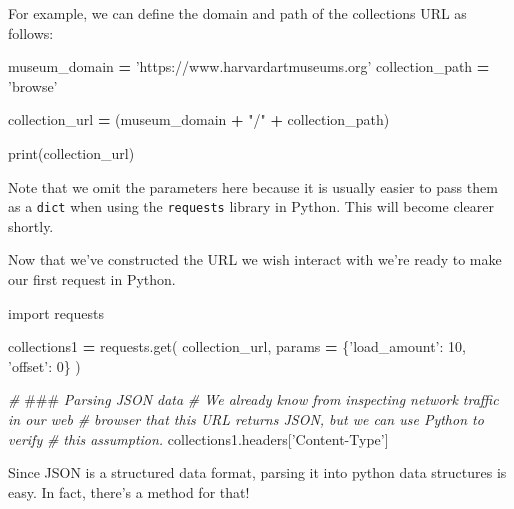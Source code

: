 \documentclass[]{book}
\newenvironment{Shaded}{\begin{snugshade}}{\end{snugshade}}
\newcommand{\DecValTok}[1]{\textcolor[rgb]{0.00,0.00,0.81}{#1}}
\newcommand{\StringTok}[1]{\textcolor[rgb]{0.31,0.60,0.02}{#1}}
\newcommand{\ImportTok}[1]{#1}
\newcommand{\CommentTok}[1]{\textcolor[rgb]{0.56,0.35,0.01}{\textit{#1}}}
\newcommand{\OperatorTok}[1]{\textcolor[rgb]{0.81,0.36,0.00}{\textbf{#1}}}
\newcommand{\BuiltInTok}[1]{#1}
\newcommand{\AlertTok}[1]{\textcolor[rgb]{0.94,0.16,0.16}{#1}}
\newcommand{\NormalTok}[1]{#1}
\begin{document}
For example, we can define the domain and path of the collections URL as
follows:

\begin{Shaded}
\begin{Highlighting}[]
\NormalTok{museum_domain }\OperatorTok{=} \StringTok{'https://www.harvardartmuseums.org'}
\NormalTok{collection_path }\OperatorTok{=} \StringTok{'browse'}

\NormalTok{collection_url }\OperatorTok{=}\NormalTok{ (museum_domain}
                  \OperatorTok{+} \StringTok{"/"}
                  \OperatorTok{+}\NormalTok{ collection_path)}

\BuiltInTok{print}\NormalTok{(collection_url)}
\end{Highlighting}
\end{Shaded}

Note that we omit the parameters here because it is usually easier to
pass them as a \texttt{dict} when using the \texttt{requests} library in
Python. This will become clearer shortly.

Now that we've constructed the URL we wish interact with we're ready to
make our first request in Python.

\begin{Shaded}
\begin{Highlighting}[]
\ImportTok{import}\NormalTok{ requests}

\NormalTok{collections1 }\OperatorTok{=}\NormalTok{ requests.get(}
\NormalTok{    collection_url,}
\NormalTok{    params }\OperatorTok{=}\NormalTok{ \{}\StringTok{'load_amount'}\NormalTok{: }\DecValTok{10}\NormalTok{,}
                  \StringTok{'offset'}\NormalTok{: }\DecValTok{0}\NormalTok{\}}
\NormalTok{)}
\end{Highlighting}
\end{Shaded}

\begin{Shaded}
\begin{Highlighting}[]
\CommentTok{# }\AlertTok{###}\CommentTok{ Parsing JSON data}
\CommentTok{# We already know from inspecting network traffic in our web}
\CommentTok{# browser that this URL returns JSON, but we can use Python to verify}
\CommentTok{# this assumption.}
\NormalTok{collections1.headers[}\StringTok{'Content-Type'}\NormalTok{]}
\end{Highlighting}
\end{Shaded}

Since JSON is a structured data format, parsing it into python data
structures is easy. In fact, there's a method for that!
\end{document}
